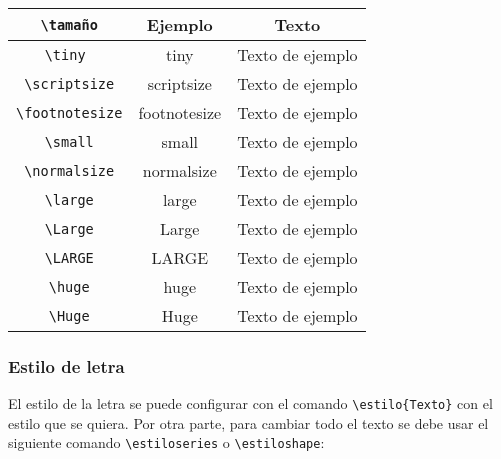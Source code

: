 	\begin{center}
		\begin{tabular}[c]{|c|c|c|}
			\hline
			\verb|\tamaño| & Ejemplo & Texto\\
			\hline
			\verb|\tiny | & {\tiny tiny} & {\tiny Texto de ejemplo}\\	
			\verb|\scriptsize| & {\scriptsize scriptsize} & {\scriptsize Texto de ejemplo}\\
			\verb|\footnotesize| & {\footnotesize footnotesize} & {\footnotesize Texto de ejemplo}\\
			\verb|\small| & {\small small} & {\small Texto de ejemplo}\\			
			\verb|\normalsize| & {\normalsize normalsize} & {\normalsize Texto de ejemplo}\\		
			\verb|\large| & {\large large} & {\large Texto de ejemplo}\\			
			\verb|\Large| & {\Large Large} & {\Large Texto de ejemplo}\\			
			\verb|\LARGE| & {\LARGE LARGE} & {\LARGE Texto de ejemplo}\\			
			\verb|\huge| & {\huge huge} & {\huge Texto de ejemplo}\\			
			\verb|\Huge| & {\Huge Huge} & {\Huge Texto de ejemplo}\\
			\hline	
		\end{tabular}
	\end{center}
	
	
	\subsubsection{Estilo de letra}
	
	El estilo de la letra se puede configurar con el comando \verb|\estilo{Texto}| con el estilo que se quiera. Por otra parte, para cambiar todo el texto se debe usar el siguiente comando \verb|\estiloseries| o \verb|\estiloshape|:
	
